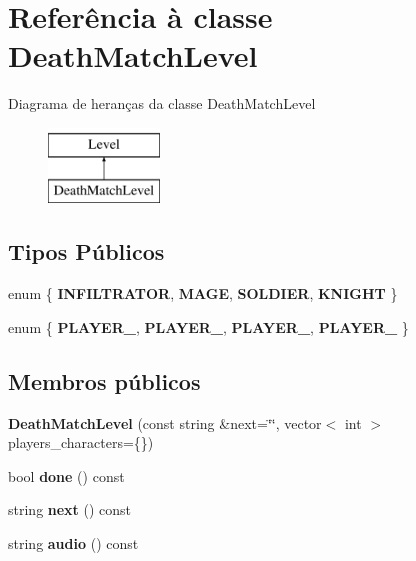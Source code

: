 \hypertarget{classDeathMatchLevel}{}\section{Referência à classe Death\+Match\+Level}
\label{classDeathMatchLevel}
Diagrama de heranças da classe Death\+Match\+Level\begin{figure}[H]
\begin{center}
\leavevmode
\includegraphics[height=2.000000cm]{classDeathMatchLevel}
\end{center}
\end{figure}
\subsection*{Tipos Públicos}
\begin{DoxyCompactItemize}
\item 
\mbox{\label{classDeathMatchLevel_a83b463b0db852f3ec9ef87bf89c1fdd2}} 
enum \{ {\bfseries I\+N\+F\+I\+L\+T\+R\+A\+T\+OR}, 
{\bfseries M\+A\+GE}, 
{\bfseries S\+O\+L\+D\+I\+ER}, 
{\bfseries K\+N\+I\+G\+HT}
 \}
\item 
\mbox{\label{classDeathMatchLevel_a3940c33316209aaba9d88e24fec09bfc}} 
enum \{ {\bfseries P\+L\+A\+Y\+E\+R\+\_}, 
{\bfseries P\+L\+A\+Y\+E\+R\+\_}, 
{\bfseries P\+L\+A\+Y\+E\+R\+\_}, 
{\bfseries P\+L\+A\+Y\+E\+R\+\_}
 \}
\end{DoxyCompactItemize}
\subsection*{Membros públicos}
\begin{DoxyCompactItemize}
\item 
\mbox{\label{classDeathMatchLevel_a3a0a88f354b3de9651f1a7d0dc0915ce}} 
{\bfseries Death\+Match\+Level} (const string \&next=\char`\"{}\char`\"{}, vector$<$ int $>$ players\+\_\+characters=\{\})
\item 
\mbox{\label{classDeathMatchLevel_afb51c6bc79031214f50b3cbbe401be9f}} 
bool {\bfseries done} () const
\item 
\mbox{\label{classDeathMatchLevel_a650f2b1aee68613f4b127393a7e33b08}} 
string {\bfseries next} () const
\item 
\mbox{\label{classDeathMatchLevel_a7114eedff2c865c69efcad08ce97c252}} 
string {\bfseries audio} () const
\end{DoxyCompactItemize}
